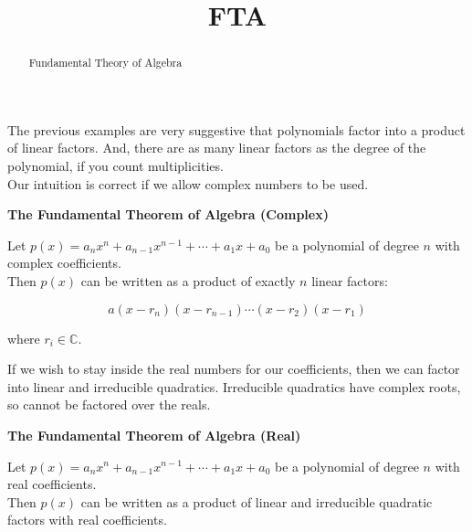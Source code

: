 \documentclass{ximera}
\title{FTA}
\begin{document}
\begin{abstract}
Fundamental Theory of Algebra
\end{abstract}
\maketitle






The previous examples are very suggestive that polynomials factor into a product of linear factors.  And, there are as many linear factors as the degree of the polynomial, if you count multiplicities. \\



Our intuition is correct if we allow complex numbers to be used. 


\begin{theorem} \textbf{\textcolor{green!50!black}{The Fundamental Theorem of Algebra (Complex)}} 



Let $p(x) = a_n x^n + a_{n-1} x^{n-1} + \cdots + a_1 x + a_0$ be a polynomial of degree $n$ with complex coefficients. \\


Then $p(x)$ can be written as a product of exactly $n$ linear factors:

\[
 a (x - r_n) (x - r_{n-1}) \cdots (x - r_2)  (x - r_1) 
\]


where $r_i \in \mathbb{C}$.


\end{theorem}




If we wish to stay inside the real numbers for our coefficients, then we can factor into linear and irreducible quadratics.  Irreducible quadratics have complex roots, so cannot be factored over the reals.



\begin{theorem} \textbf{\textcolor{green!50!black}{The Fundamental Theorem of Algebra (Real)}} 



Let $p(x) = a_n x^n + a_{n-1} x^{n-1} + \cdots + a_1 x + a_0$ be a polynomial of degree $n$ with real coefficients. \\


Then $p(x)$ can be written as a product of linear and irreducible quadratic factors with real coefficients.


\end{theorem}
\end{document}
